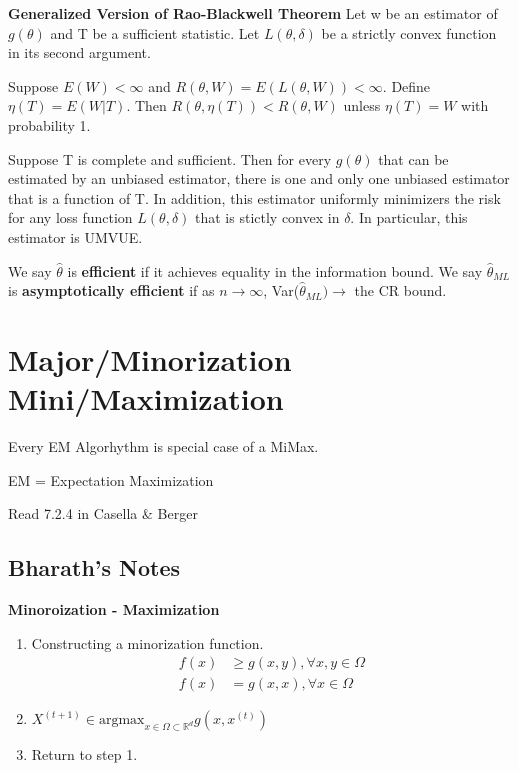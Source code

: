 \documentclass[11pt,fleqn]{book} %
\begin{document}
\textbf{Generalized Version of Rao-Blackwell Theorem}
Let w be an estimator of $g(\theta)$ and T be a sufficient statistic. Let $L(\theta,\delta)$ be a strictly convex function in its second argument.

Suppose $E(W)<\infty$ and $R(\theta, W) = E(L(\theta,W))<\infty$. Define $\eta(T) = E(W|T)$. Then $R(\theta, \eta(T)) < R(\theta, W)$ unless $\eta(T)=W$ with probability 1.

\begin{theorem}
	Suppose T is complete and sufficient. Then for every $g(\theta)$ that can be estimated by an unbiased estimator, there is one and only one unbiased estimator that is a function of T. In addition, this estimator uniformly minimizers the risk for any loss function $L(\theta, \delta)$ that is stictly convex in $\delta$. In particular, this estimator is UMVUE.
\end{theorem}

We say $\hat{\theta}$ is \textbf{efficient} if it achieves equality in the information bound. We say $\hat\theta_{ML}$ is \textbf{asymptotically efficient} if as $n\rightarrow \infty$, Var($\hat\theta_{ML}) \rightarrow $ the CR bound. 

\section{Major/Minorization Mini/Maximization}

Every EM Algorhythm is special case of a MiMax.

EM = Expectation Maximization

\begin{remark}
	Read 7.2.4 in Casella \& Berger
\end{remark}

\subsection{Bharath's Notes}

\textbf{Minoroization - Maximization}

\begin{enumerate}
	\item Constructing a minorization function. 
	\begin{align*}
		f(x) &\ge g(x,y), \forall x,y \in \Omega\\
		f(x) &= g(x,x), \forall x \in \Omega
	\end{align*}
	\item $X^{(t+1)} \in \text{argmax}_{x \in \Omega \subset \mathbb{R}^d } g(x,x^{(t)})$
	\item Return to step 1.
	\end{enumerate}
\end{document}
